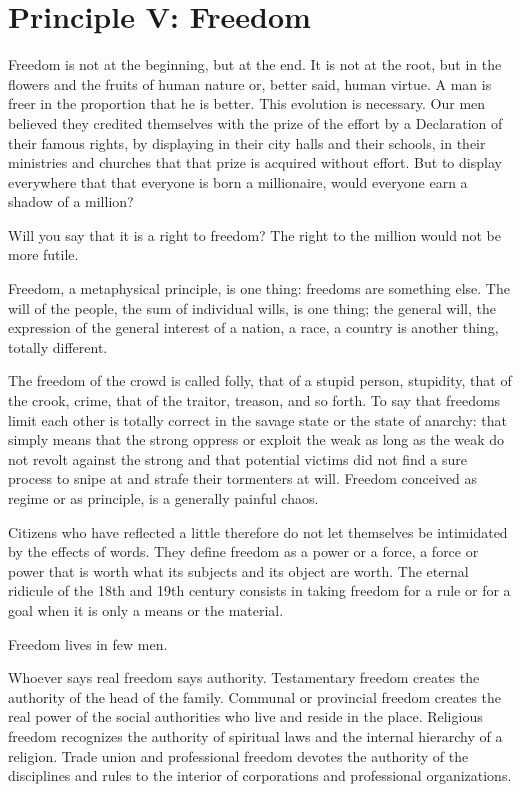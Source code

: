 \section{Principle V: Freedom}

Freedom is not at the beginning, but at the end. It is not at the root, but in the flowers and the fruits of human nature or, better said, human virtue. A man is freer in the proportion that he is better. This evolution is necessary. Our men believed they credited themselves with the prize of the effort by a Declaration of their famous rights, by displaying in their city halls and their schools, in their ministries and churches that that prize is acquired without effort. But to display everywhere that that everyone is born a millionaire, would everyone earn a shadow of a million?

Will you say that it is a right to freedom? The right to the million would not be more futile.

Freedom, a metaphysical principle, is one thing: freedoms are something else. The will of the people, the sum of individual wills, is one thing; the general will, the expression of the general interest of a nation, a race, a country is another thing, totally different.

The freedom of the crowd is called folly, that of a stupid person, stupidity, that of the crook, crime, that of the traitor, treason, and so forth. To say that freedoms limit each other is totally correct in the savage state or the state of anarchy: that simply means that the strong oppress or exploit the weak as long as the weak do not revolt against the strong and that potential victims did not find a sure process to snipe at and strafe their tormenters at will. Freedom conceived as regime or as principle, is a generally painful chaos.

Citizens who have reflected a little therefore do not let themselves be intimidated by the effects of words. They define freedom as a power or a force, a force or power that is worth what its subjects and its object are worth. The eternal ridicule of the 18th and 19th century consists in taking freedom for a rule or for a goal when it is only a means or the material.

Freedom lives in few men.

Whoever says real freedom says authority. Testamentary freedom creates the authority of the head of the family. Communal or provincial freedom creates the real power of the social authorities who live and reside in the place. Religious freedom recognizes the authority of spiritual laws and the internal hierarchy of a religion. Trade union and professional freedom devotes the authority of the disciplines and rules to the interior of corporations and professional organizations.

